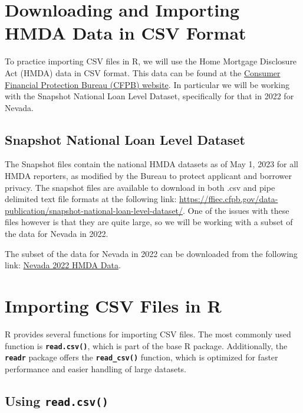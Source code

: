 \documentclass[
]{book}
\begin{document}
\hypertarget{downloading-and-importing-hmda-data-in-csv-format}{%
\section{Downloading and Importing HMDA Data in CSV Format}\label{downloading-and-importing-hmda-data-in-csv-format}}

To practice importing CSV files in R, we will use the Home Mortgage Disclosure Act (HMDA) data in CSV format. This data can be found at the \href{https://ffiec.cfpb.gov/}{Consumer Financial Protection Bureau (CFPB) website}. In particular we will be working with the Snapshot National Loan Level Dataset, specifically for that in 2022 for Nevada.

\hypertarget{snapshot-national-loan-level-dataset}{%
\subsection{Snapshot National Loan Level Dataset}\label{snapshot-national-loan-level-dataset}}

The Snapshot files contain the national HMDA datasets as of May 1, 2023 for all HMDA reporters, as modified by the Bureau to protect applicant and borrower privacy. The snapshot files are available to download in both .csv and pipe delimited text file formats at the following link: \url{https://ffiec.cfpb.gov/data-publication/snapshot-national-loan-level-dataset/}. One of the issues with these files however is that they are quite large, so we will be working with a subset of the data for Nevada in 2022.

The subset of the data for Nevada in 2022 can be downloaded from the following link: \href{https://ffiec.cfpb.gov/v2/data-browser-api/view/csv?states=NV\&years=2022}{Nevada 2022 HMDA Data}.

\hypertarget{importing-csv-files-in-r}{%
\section{Importing CSV Files in R}\label{importing-csv-files-in-r}}

R provides several functions for importing CSV files. The most commonly used function is \textbf{\texttt{read.csv()}}, which is part of the base R package. Additionally, the \textbf{\texttt{readr}} package offers the \textbf{\texttt{read\_csv()}} function, which is optimized for faster performance and easier handling of large datasets.

\hypertarget{using-read.csv}{%
\subsection{\texorpdfstring{Using \texttt{read.csv()}}{Using read.csv()}}\label{using-read.csv}}
\end{document}
